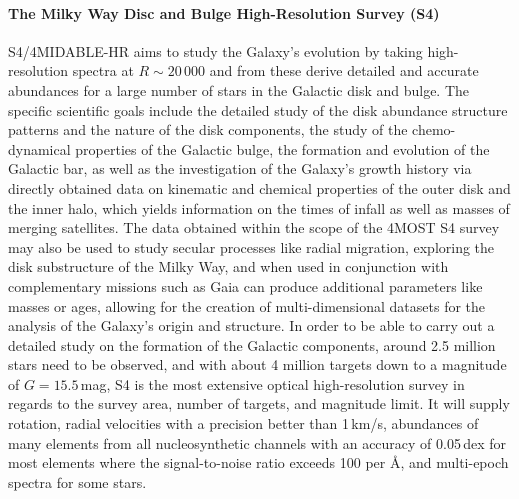 \documentclass[a4paper,11pt]{article}
\begin{document}
\paragraph{The Milky Way Disc and Bulge High-Resolution Survey (S4)}
S4/4MIDABLE-HR \citep{4mosts4} aims to study the Galaxy's evolution by taking high-resolution spectra at $R\sim20\,000$ and from these derive detailed and accurate abundances for a large number of stars in the Galactic disk and bulge. The specific scientific goals include the detailed study of the disk abundance structure patterns and the nature of the disk components, the study of the chemo-dynamical properties of the Galactic bulge, the formation and evolution of the Galactic bar, as well as the investigation of the Galaxy's growth history via directly obtained data on kinematic and chemical properties of the outer disk and the inner halo, which yields information on the times of infall as well as masses of merging satellites. The data obtained within the scope of the 4MOST S4 survey may also be used to study secular processes like radial migration, exploring the disk substructure of the Milky Way, and when used in conjunction with complementary missions such as Gaia can produce additional parameters like masses or ages, allowing for the creation of multi-dimensional datasets for the analysis of the Galaxy's origin and structure. In order to be able to carry out a detailed study on the formation of the Galactic components, around 2.5 million stars need to be observed, and with about 4 million targets down to a magnitude of $G=15.5$\,mag, S4 is the most extensive optical high-resolution survey in regards to the survey area, number of targets, and magnitude limit. It will supply rotation, radial velocities with a precision better than 1\,km/s, abundances of many elements from all nucleosynthetic channels with an accuracy of 0.05\,dex for most elements where the signal-to-noise ratio exceeds 100 per \AA, and multi-epoch spectra for some stars.
%
\end{document}
